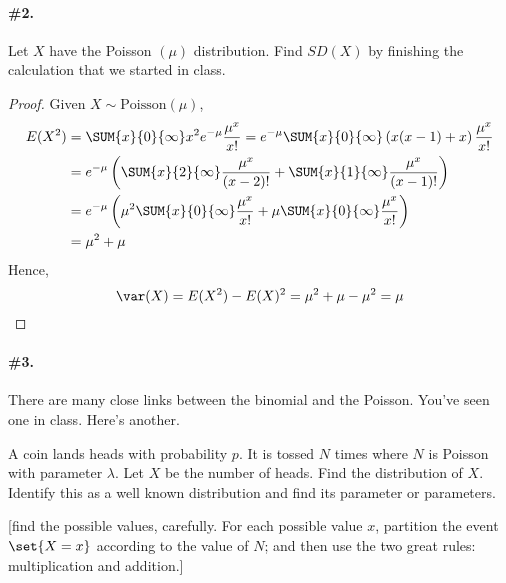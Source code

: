\documentclass[12pt,titlepage]{article}
\begin{document}
\paragraph{\#2.} Let $X$ have the Poisson $(\mu)$ distribution. Find $SD(X)$ by finishing the calculation that we started in class.

\begin{proof} Given $X \sim \text{Poisson}(\mu)$, 
\begin{align*}
E(X^2) &= \SUM{x}{0}{\infty} x^{2} e^{-\mu} \frac{\mu^{x}}{x!} = e^{-\mu} \SUM{x}{0}{\infty} \left(x(x-1) + x\right) \frac{\mu^x}{x!} \\
&= e^{-\mu}\left( \SUM{x}{2}{\infty} \frac{\mu^{x}}{(x-2)!} + \SUM{x}{1}{\infty} \frac{\mu^x}{(x-1)!} \right) \\
&= e^{-\mu}\left( \mu^2 \SUM{x}{0}{\infty} \frac{\mu^{x}}{x!} + \mu \SUM{x}{0}{\infty} \frac{\mu^x}{x!} \right) \\
&=\mu^2 + \mu
\end{align*}
Hence, 
\[
\var(X) = E(X^2) - E(X)^2 = \mu^2 + \mu - \mu^2 = \mu
\]
\end{proof}

\paragraph{\#3.} There are many close links between the binomial and the Poisson. You've seen one in class. Here's another.

A coin lands heads with probability $p$. It is tossed $N$ times where $N$ is Poisson with parameter $\lambda$. Let $X$ be the number of heads. Find the distribution of $X$. Identify this as a well known distribution and find its parameter or parameters. 

[\Hint find the possible values, carefully. For each possible value $x$, partition the event $\set{X=x}$ according to the value of $N$; and then use the two great rules: multiplication and addition.]
\end{document}

